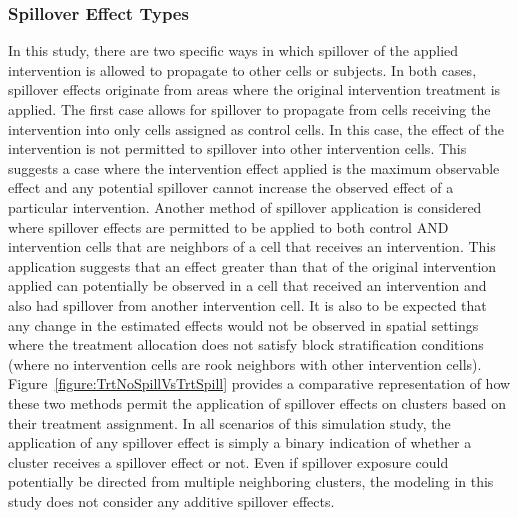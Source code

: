 \documentclass{article}[11pt]
\begin{document}



\subsubsection{Spillover Effect Types}\label{section:SpilloverEffectTypes}

In this study, there are two specific ways in which spillover of the applied intervention is allowed to propagate to other cells or subjects. In both cases, spillover effects originate from areas where the original intervention treatment is applied. The first case allows for spillover to propagate from cells receiving the intervention into only cells assigned as control cells. In this case, the effect of the intervention is not permitted to spillover into other intervention cells. This suggests a case where the intervention effect applied is the maximum observable effect and any potential spillover cannot increase the observed effect of a particular intervention. Another method of spillover application is considered where spillover effects are permitted to be applied to both control AND intervention cells that are neighbors of a cell that receives an intervention. This application suggests that an effect greater than that of the original intervention applied can potentially be observed in a cell that received an intervention and also had spillover from another intervention cell. It is also to be expected that any change in the estimated effects would not be observed in spatial settings where the treatment allocation does not satisfy block stratification conditions (where no intervention cells are rook neighbors with other intervention cells). Figure~\ref{figure:TrtNoSpillVsTrtSpill} provides a comparative representation of how these two methods permit the application of spillover effects on clusters based on their treatment assignment. In all scenarios of this simulation study, the application of any spillover effect is simply a binary indication of whether a cluster receives a spillover effect or not. Even if spillover exposure could potentially be directed from multiple neighboring clusters, the modeling in this study does not consider any additive spillover effects.
\end{document}
